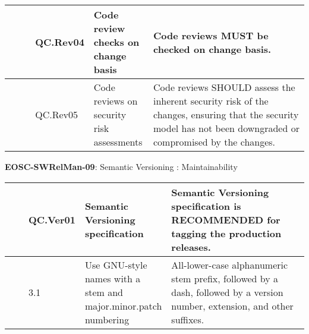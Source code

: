 \begin{center}
\begin{supertabular}{|p{0.10\linewidth}|p{0.10\linewidth}|p{0.20\linewidth}|p{0.60\linewidth}|}
        \cite{orviz_set_2017} & QC.Rev04 & Code review checks on change basis & Code reviews MUST be checked on change basis.\\ \hline
        \cite{orviz_set_2017} & QC.Rev05 & Code reviews on security risk assessments & Code reviews SHOULD assess the inherent security risk of the changes, ensuring that the security model has not been downgraded or compromised by the changes.\\ \hline
    \end{supertabular}
\end{center}

\textbf{EOSC-SWRelMan-09}: Semantic Versioning : Maintainability
\nopagebreak[4]
\begin{center}
    \tabletail{\hline}
    \tiny
    \begin{supertabular}{|p{0.10\linewidth}|p{0.10\linewidth}|p{0.20\linewidth}|p{0.60\linewidth}|} \hline
        \cite{orviz_set_2017} & QC.Ver01 & Semantic Versioning specification & Semantic Versioning specification is RECOMMENDED for tagging the production releases.\\ \hline
        \cite{raymond_software_2013} & 3.1 & Use GNU-style names with a stem and major.minor.patch numbering & All-lower-case alphanumeric stem prefix, followed by a dash, followed by a version number, extension, and other suffixes.\\ \hline
    \end{supertabular}
\end{center}

